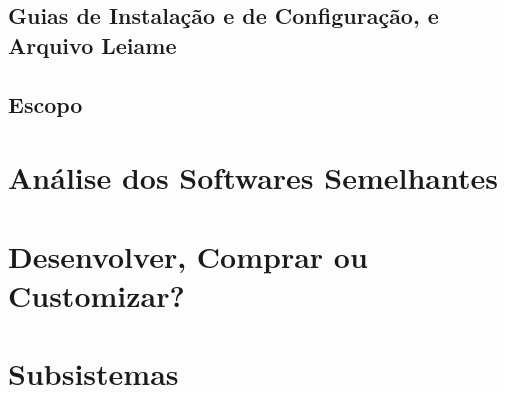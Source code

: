 \subsection{Guias de Instalação e de Configuração, e Arquivo Leiame}

\subsection{Escopo}

\section{Análise dos Softwares Semelhantes}

\section{Desenvolver, Comprar ou Customizar?}

\section{Subsistemas}
  
